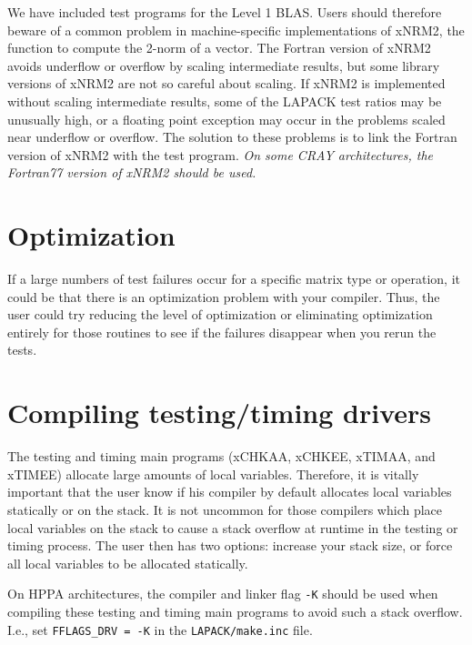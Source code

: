 \documentclass[11pt]{report}
\begin{document}
We have included test programs for the Level 1 BLAS.
Users should therefore beware of a common problem in machine-specific
implementations of xNRM2,
the function to compute the 2-norm of a vector.
The Fortran version of xNRM2 avoids underflow or overflow
by scaling intermediate results, but some library versions of xNRM2
are not so careful about scaling.
If xNRM2 is implemented without scaling intermediate results, some of
the LAPACK test ratios may be unusually high, or
a floating point exception may occur in the problems scaled near
underflow or overflow.
The solution to these problems is to link the Fortran version of
xNRM2 with the test program.  \emph{On some CRAY architectures, the Fortran77
version of xNRM2 should be used.}

\section{Optimization}

If a large numbers of test failures occur for a specific matrix type
or operation, it could be that there is an optimization problem with
your compiler.  Thus, the user could try reducing the level of
optimization or eliminating optimization entirely for those routines
to see if the failures disappear when you rerun the tests.


\section{Compiling testing/timing drivers}

The testing and timing main programs (xCHKAA, xCHKEE, xTIMAA, and
xTIMEE)
allocate large amounts of local variables.  Therefore, it is vitally
important that the user know if his compiler by default allocates local
variables statically or on the stack.  It is not uncommon for those
compilers which place local variables on the stack to cause a stack
overflow at runtime in the testing or timing process.  The user then
has two options:  increase your stack size, or force all local variables
to be allocated statically.

On HPPA architectures, the
compiler and linker flag \texttt{-K} should be used when compiling these testing
and timing main programs to avoid such a stack overflow.  I.e., set
\texttt{FFLAGS\_DRV = -K} in the \texttt{LAPACK/make.inc} file.
\end{document}
